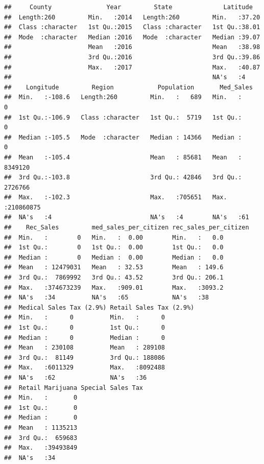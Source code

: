 \documentclass[]{article}
\begin{document}
\begin{verbatim}
##     County               Year         State              Latitude    
##  Length:260         Min.   :2014   Length:260         Min.   :37.20  
##  Class :character   1st Qu.:2015   Class :character   1st Qu.:38.01  
##  Mode  :character   Median :2016   Mode  :character   Median :39.07  
##                     Mean   :2016                      Mean   :38.98  
##                     3rd Qu.:2016                      3rd Qu.:39.86  
##                     Max.   :2017                      Max.   :40.87  
##                                                       NA's   :4      
##    Longitude         Region            Population       Med_Sales        
##  Min.   :-108.6   Length:260         Min.   :   689   Min.   :        0  
##  1st Qu.:-106.9   Class :character   1st Qu.:  5719   1st Qu.:        0  
##  Median :-105.5   Mode  :character   Median : 14366   Median :        0  
##  Mean   :-105.4                      Mean   : 85681   Mean   :  8349120  
##  3rd Qu.:-103.8                      3rd Qu.: 42846   3rd Qu.:  2726766  
##  Max.   :-102.3                      Max.   :705651   Max.   :210860875  
##  NA's   :4                           NA's   :4        NA's   :61         
##    Rec_Sales         med_sales_per_citizen rec_sales_per_citizen
##  Min.   :        0   Min.   :  0.00        Min.   :   0.0       
##  1st Qu.:        0   1st Qu.:  0.00        1st Qu.:   0.0       
##  Median :        0   Median :  0.00        Median :   0.0       
##  Mean   : 12479031   Mean   : 32.53        Mean   : 149.6       
##  3rd Qu.:  7869992   3rd Qu.: 43.52        3rd Qu.: 206.1       
##  Max.   :374673239   Max.   :909.01        Max.   :3093.2       
##  NA's   :34          NA's   :65            NA's   :38           
##  Medical Sales Tax (2.9%) Retail Sales Tax (2.9%)
##  Min.   :      0          Min.   :      0        
##  1st Qu.:      0          1st Qu.:      0        
##  Median :      0          Median :      0        
##  Mean   : 230108          Mean   : 289108        
##  3rd Qu.:  81149          3rd Qu.: 188086        
##  Max.   :6011329          Max.   :8092488        
##  NA's   :62               NA's   :36             
##  Retail Marijuana Special Sales Tax
##  Min.   :       0                  
##  1st Qu.:       0                  
##  Median :       0                  
##  Mean   : 1135213                  
##  3rd Qu.:  659683                  
##  Max.   :39493849                  
##  NA's   :34
\end{verbatim}
\end{document}
